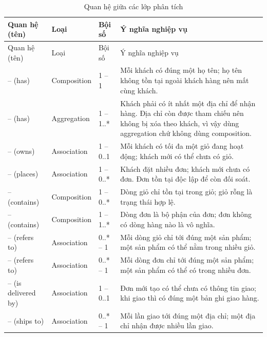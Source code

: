 \documentclass[12pt,a4paper]{article}
\begin{document}
\begin{longtable}{@{}P{4.0cm}P{2.3cm}P{1.8cm}P{7.4cm}@{}}
\caption{Quan hệ giữa các lớp phân tích}\label{tab:assoc41}\\
\toprule
Quan hệ (tên) & Loại & Bội số & Ý nghĩa nghiệp vụ\\
\midrule
\endfirsthead
\toprule
Quan hệ (tên) & Loại & Bội số & Ý nghĩa nghiệp vụ\\
\midrule
\endhead
\small{} --  (has) & \small Composition & \small 1 -- 1 & \small Mỗi khách có đúng một họ tên; họ tên không tồn tại ngoài khách hàng nên mất cùng khách.\\
\small{} --  (has) & \small Aggregation & \small 1 -- 1..* & \small Khách phải có ít nhất một địa chỉ để nhận hàng. Địa chỉ còn được  tham chiếu nên không bị xóa theo khách, vì vậy dùng aggregation chứ không dùng composition.\\
\small{} --  (owns) & \small Association & \small 1 -- 0..1 & \small Mỗi khách có tối đa một giỏ đang hoạt động; khách mới có thể chưa có giỏ.\\
\small{} --  (places) & \small Association & \small 1 -- 0..* & \small Khách đặt nhiều đơn; khách mới chưa có đơn. Đơn tồn tại độc lập để còn đối soát.\\
\small{} --  (contains) & \small Composition & \small 1 -- 0..* & \small Dòng giỏ chỉ tồn tại trong giỏ; giỏ rỗng là trạng thái hợp lệ.\\
\small{} --  (contains) & \small Composition & \small 1 -- 1..* & \small Dòng đơn là bộ phận của đơn; đơn không có dòng hàng nào là vô nghĩa.\\
\small{} --  (refers to) & \small Association & \small 0..* -- 1 & \small Mỗi dòng giỏ chỉ tới đúng một sản phẩm; một sản phẩm có thể nằm trong nhiều giỏ.\\
\small{} --  (refers to) & \small Association & \small 0..* -- 1 & \small Mỗi dòng đơn chỉ tới đúng một sản phẩm; một sản phẩm có thể có trong nhiều đơn.\\
\small{} --  (is delivered by) & \small Association & \small 1 -- 0..1 & \small Đơn mới tạo có thể chưa có thông tin giao; khi giao thì có đúng một bản ghi giao hàng.\\
\small{} --  (ships to) & \small Association & \small 0..* -- 1 & \small Mỗi lần giao tới đúng một địa chỉ; một địa chỉ nhận được nhiều lần giao.\\

\end{longtable}
\end{document}
